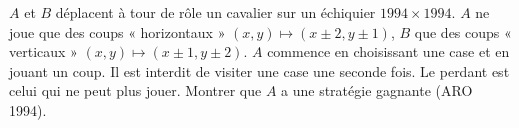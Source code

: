 $A$ et $B$ déplacent à tour de rôle un cavalier sur un échiquier $1994 \times 1994$. $A$ ne joue que des coups « horizontaux » $(x, y) \mapsto (x \pm 2, y \pm 1)$, $B$ que des coups « verticaux » $(x, y) \mapsto (x \pm 1, y \pm 2)$. $A$ commence en choisissant une case et en jouant un coup. Il est interdit de visiter une case une seconde fois. Le perdant est celui qui ne peut plus jouer. Montrer que $A$ a une stratégie gagnante (ARO 1994).

